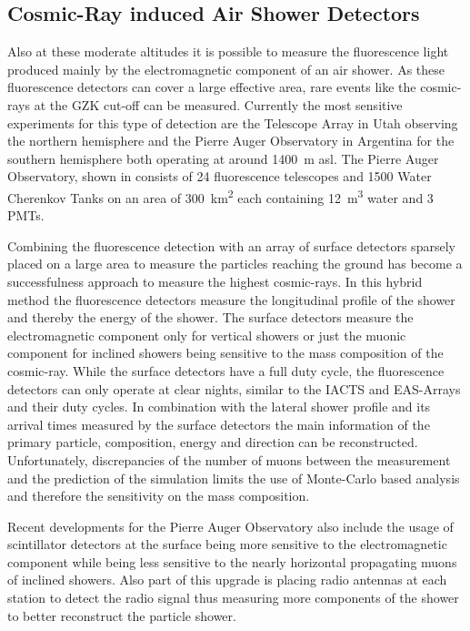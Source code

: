 \subsection{Cosmic-Ray induced Air Shower Detectors}

Also at these moderate altitudes it is possible to measure the fluorescence light produced mainly by the electromagnetic component of an air shower.
As these fluorescence detectors can cover a large effective area, rare events like the cosmic-rays at the GZK cut-off can be measured.
Currently the most sensitive experiments for this type of detection are the Telescope Array \cite{TA12FD, TA13SD} in Utah observing the northern hemisphere and the Pierre Auger Observatory \cite{Auger15} in Argentina for the southern hemisphere both operating at around \SI{1400}{m} asl.
The Pierre Auger Observatory, shown in  consists of 24 fluorescence telescopes and 1500 Water Cherenkov Tanks on an area of \SI{300}{\square\kilo\meter} each containing \SI{12}{\cubic\meter} water and 3 PMTs.

Combining the fluorescence detection with an array of surface detectors sparsely placed on a large area to measure the particles reaching the ground has become a successfulness approach to measure the highest cosmic-rays.
In this hybrid method the fluorescence detectors measure the longitudinal profile of the shower and thereby the energy of the shower.
The surface detectors measure the electromagnetic component only for vertical showers or just the muonic component for inclined showers being sensitive to the mass composition of the cosmic-ray.
While the surface detectors have a full duty cycle, the fluorescence detectors can only operate at clear nights, similar to the IACTS and EAS-Arrays and their duty cycles.
In combination with the lateral shower profile and its arrival times measured by the surface detectors the main information of the primary particle, composition, energy and direction can be reconstructed.
Unfortunately, discrepancies of the number of muons between the measurement and the prediction of the simulation limits the use of Monte-Carlo based analysis and therefore the sensitivity on the mass composition.

Recent developments for the Pierre Auger Observatory \cite{Auger16Prime, Castellina19Prime} also include the usage of scintillator detectors at the surface being more sensitive to the electromagnetic component while being less sensitive to the nearly horizontal propagating muons of inclined showers.
Also part of this upgrade is placing radio antennas at each station to detect the radio signal thus measuring more components of the shower to better reconstruct the particle shower.

